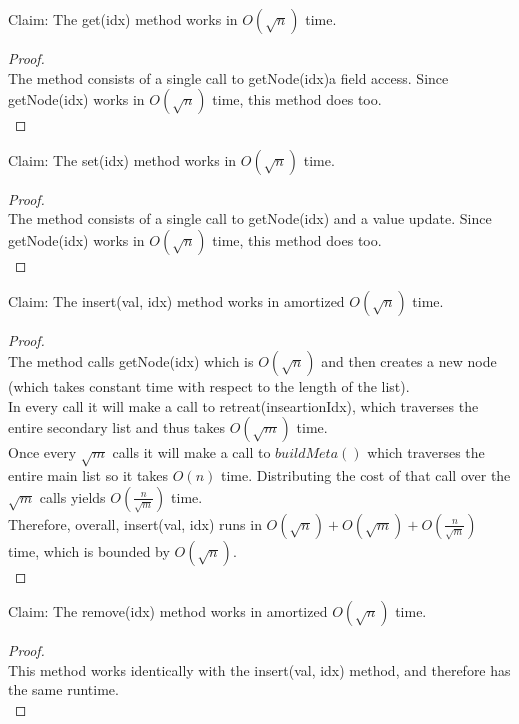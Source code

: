 \documentclass[10pt]{article}
\begin{document}
Claim: The get(idx) method works in $O(\sqrt{n})$ time.
\begin{proof}
	$ $\\
	The method consists of a single call to getNode(idx)a field access. Since getNode(idx) works in $O(\sqrt{n})$ time, this method does too.\\
\end{proof}

Claim: The set(idx) method works in $O(\sqrt{n})$ time.
\begin{proof}
	$ $\\
	The method consists of a single call to getNode(idx) and a value update. Since getNode(idx) works in $O(\sqrt{n})$ time, this method does too.\\
\end{proof}

Claim: The insert(val, idx) method works in amortized $O(\sqrt{n})$ time.
\begin{proof}
	$ $\\
	The method calls getNode(idx) which is $O(\sqrt{n})$ and then creates a new node (which takes constant time with respect to the length of the list).\\
	In every call it will make a call to retreat(inseartionIdx), which traverses the entire secondary list and thus takes $O(\sqrt{m})$ time.\\
	Once every $\sqrt{m}$ calls it will make a call to $buildMeta()$ which traverses the entire main list so it takes $O(n)$ time. Distributing the cost of that call over the $\sqrt{m}$ calls yields $O(\frac{n}{\sqrt{m}})$ time.\\
	Therefore, overall, insert(val, idx) runs in $O(\sqrt{n}) + O(\sqrt{m}) + O(\frac{n}{\sqrt{m}})$ time, which is bounded by $O(\sqrt{n})$.\\
\end{proof}

Claim: The remove(idx) method works in amortized $O(\sqrt{n})$ time.
\begin{proof}
	$ $\\
	This method works identically with the insert(val, idx) method, and therefore has the same runtime.\\
\end{proof}
\end{document}
